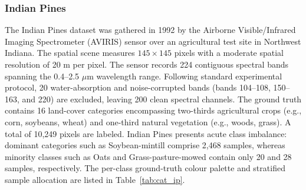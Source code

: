\documentclass[manuscript,screen,review]{acmart}
\begin{document}
\subsubsection{Indian Pines}
The Indian Pines dataset was gathered in 1992 by the Airborne Visible/Infrared Imaging Spectrometer (AVIRIS) sensor \cite{green1998imaging} over an agricultural test site in Northwest Indiana. The spatial scene measures $145 \times 145$ pixels with a moderate spatial resolution of 20 m per pixel. The sensor records 224 contiguous spectral bands spanning the 0.4--2.5 $\mu$m wavelength range. Following standard experimental protocol, 20 water-absorption and noise-corrupted bands (bands 104--108, 150--163, and 220) are excluded, leaving 200 clean spectral channels. The ground truth contains 16 land-cover categories encompassing two-thirds agricultural crops (e.g., corn, soybeans, wheat) and one-third natural vegetation (e.g., woods, grass). A total of 10,249 pixels are labeled. Indian Pines presents acute class imbalance: dominant categories such as Soybean-mintill comprise 2,468 samples, whereas minority classes such as Oats and Grass-pasture-mowed contain only 20 and 28 samples, respectively. The per-class ground-truth colour palette and stratified sample allocation are listed in Table~\ref{tab:cat_ip}.
\end{document}
